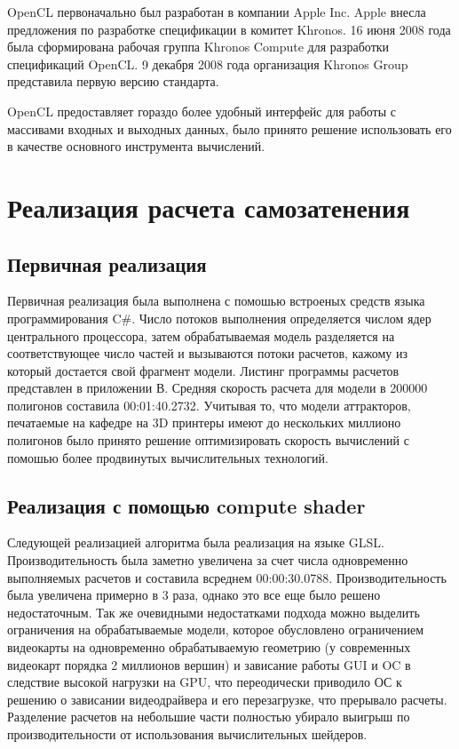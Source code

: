 OpenCL первоначально был разработан в компании Apple Inc. Apple внесла предложения по разработке спецификации в комитет Khronos. 16 июня 2008 года была сформирована рабочая группа Khronos Compute для разработки спецификаций OpenCL. 9 декабря 2008 года организация Khronos Group представила первую версию стандарта.

OpenCL предоставляет гораздо более удобный интерфейс для работы с массивами входных и выходных данных, было принято решение использовать его в качестве основного инструмента вычислений.

\clearpage
\section{Реализация расчета самозатенения}\label{main_part}
\subsection{Первичная реализация}
Первичная реализация была выполнена с помошью встроеных средств языка программирования C\#. Число потоков выполнения определяется числом ядер центрального процессора, затем обрабатываемая модель разделяется на соответствующее число частей и вызываются потоки расчетов, кажому из который достается свой фрагмент модели. Листинг программы расчетов представлен в приложении В. Средняя скорость расчета для модели в 200000 полигонов составила 00:01:40.2732. Учитывая то, что модели аттракторов, печатаемые на кафедре на 3D принтеры имеют до нескольких миллионо полигонов было принято решение оптимизировать скорость вычислений с помошью более продвинутых вычислительных технологий. 
\subsection{Реализация с помощью compute shader}
Следующей реализацией алгоритма была реализация на языке GLSL. Производительность была заметно увеличена за счет числа одновременно выполняемых расчетов и составила всреднем 00:00:30.0788. Производительность была увеличена примерно в 3 раза, однако это все еще было решено недостаточным. Так же очевидными недостатками подхода можно выделить ограничения на обрабатываемые модели, которое обусловлено ограничением видеокарты на одновременно обрабатываемую геометрию (у современных видеокарт порядка 2 миллионов вершин) и зависание работы GUI и OC в следствие высокой нагрузки на GPU, что переодически приводило ОС к решению о зависании видеодрайвера и его перезагрузке, что прерывало расчеты. Разделение расчетов на небольшие части полностью убирало выигрыш по производительности от использования вычислительных шейдеров.

